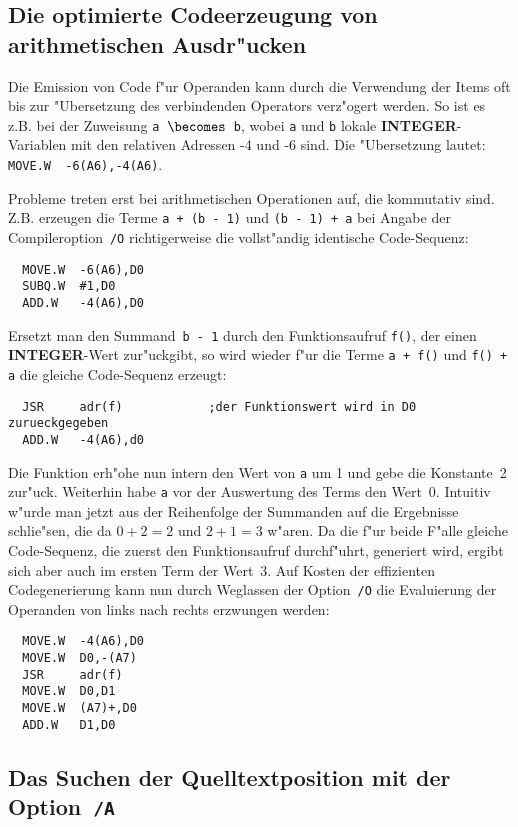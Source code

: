 \subsection{Die optimierte Codeerzeugung von arithmetischen Ausdr"ucken}
\label{Optimierung}

Die Emission von Code f"ur Operanden kann durch die Verwendung der
Items oft bis zur "Ubersetzung des verbindenden Operators verz"ogert
werden.
So ist es z.B. bei der Zuweisung {\tt a $\becomes$ b}, wobei {\tt a} und {\tt b}
lokale {\bf INTEGER}-Variablen mit den relativen Adressen -4 und -6 sind.
Die "Ubersetzung lautet: {\tt MOVE.W\ \ -6(A6),-4(A6)}.

Probleme treten erst bei arithmetischen Operationen auf, die kommutativ sind.
Z.B. erzeugen die Terme {\tt a + (b - 1)} und {\tt (b - 1) + a}
bei Angabe der Compileroption~{\tt /O} richtigerweise die vollst"andig
identische Code-Sequenz:
\begin{verbatim}
  MOVE.W  -6(A6),D0
  SUBQ.W  #1,D0
  ADD.W   -4(A6),D0
\end{verbatim}
Ersetzt man den Summand~{\tt b - 1} durch den Funktionsaufruf {\tt f()},
der einen {\bf INTEGER}-Wert zur"uckgibt, so wird wieder f"ur die
Terme {\tt a + f()} und {\tt f() + a} die gleiche Code-Sequenz
erzeugt:
\begin{verbatim}
  JSR	  adr(f)            ;der Funktionswert wird in D0 zurueckgegeben
  ADD.W   -4(A6),d0
\end{verbatim}

Die Funktion erh"ohe nun intern den Wert von {\tt a} um 1 und gebe die
Konstante~2 zur"uck.
Weiterhin habe {\tt a} vor der Auswertung des Terms den Wert~0.
Intuitiv w"urde man jetzt aus der Reihenfolge der Summanden auf die
Ergebnisse schlie"sen, die da $0+2=2$ und $2+1=3$ w"aren.
Da die f"ur beide F"alle gleiche Code-Sequenz, die zuerst den Funktionsaufruf durchf"uhrt,
generiert wird, ergibt sich aber auch im ersten Term der Wert~3.
Auf Kosten der effizienten Codegenerierung kann nun durch Weglassen der
Option~{\tt /O} die Evaluierung der Operanden von links nach rechts
erzwungen werden:
\begin{verbatim}
  MOVE.W  -4(A6),D0
  MOVE.W  D0,-(A7)
  JSR     adr(f)
  MOVE.W  D0,D1
  MOVE.W  (A7)+,D0
  ADD.W   D1,D0
\end{verbatim}

\subsection{Das Suchen der Quelltextposition mit der Option~{\tt /A}}
\label{Suchen}

